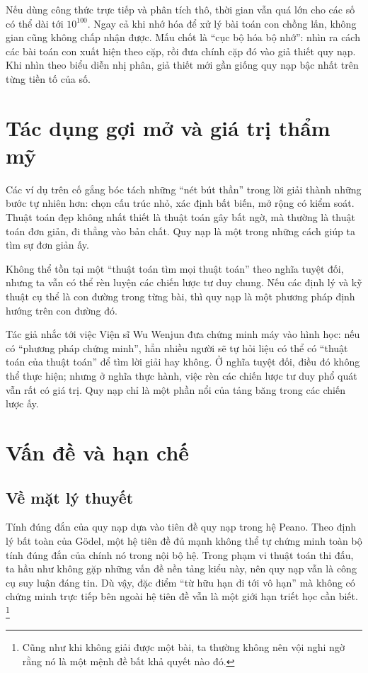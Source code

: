 \documentclass[11pt]{article}
\begin{document}
Nếu dùng công thức trực tiếp và phân tích thô, thời gian vẫn quá lớn cho các
số có thể dài tới \(10^{100}\). Ngay cả khi nhớ hóa để xử lý bài toán con
chồng lấn, không gian cũng không chấp nhận được. Mấu chốt là ``cục bộ hóa bộ
nhớ'': nhìn ra cách các bài toán con xuất hiện theo cặp, rồi đưa chính cặp đó
vào giả thiết quy nạp. Khi nhìn theo biểu diễn nhị phân, giả thiết mới gần
giống quy nạp bậc nhất trên từng tiền tố của số.

\section{Tác dụng gợi mở và giá trị thẩm mỹ}

Các ví dụ trên cố gắng bóc tách những ``nét bút thần'' trong lời giải thành
những bước tự nhiên hơn: chọn cấu trúc nhỏ, xác định bất biến, mở rộng có kiểm
soát. Thuật toán đẹp không nhất thiết là thuật toán gây bất ngờ, mà thường là
thuật toán đơn giản, đi thẳng vào bản chất. Quy nạp là một trong những cách
giúp ta tìm sự đơn giản ấy.

Không thể tồn tại một ``thuật toán tìm mọi thuật toán'' theo nghĩa tuyệt đối,
nhưng ta vẫn có thể rèn luyện các chiến lược tư duy chung. Nếu các định lý và
kỹ thuật cụ thể là con đường trong từng bài, thì quy nạp là một phương pháp
định hướng trên con đường đó.

Tác giả nhắc tới việc Viện sĩ Wu Wenjun đưa chứng minh máy vào hình học: nếu
có ``phương pháp chứng minh'', hẳn nhiều người sẽ tự hỏi liệu có thể có
``thuật toán của thuật toán'' để tìm lời giải hay không. Ở nghĩa tuyệt đối,
điều đó không thể thực hiện; nhưng ở nghĩa thực hành, việc rèn các chiến lược
tư duy phổ quát vẫn rất có giá trị. Quy nạp chỉ là một phần nổi của tảng băng
trong các chiến lược ấy.

\section{Vấn đề và hạn chế}

\subsection{Về mặt lý thuyết}

Tính đúng đắn của quy nạp dựa vào tiên đề quy nạp trong hệ Peano. Theo định
lý bất toàn của Gödel, một hệ tiên đề đủ mạnh không thể tự chứng minh toàn bộ
tính đúng đắn của chính nó trong nội bộ hệ. Trong phạm vi thuật toán thi đấu,
ta hầu như không gặp những vấn đề nền tảng kiểu này, nên quy nạp vẫn là công
cụ suy luận đáng tin. Dù vậy, đặc điểm ``từ hữu hạn đi tới vô hạn'' mà không
có chứng minh trực tiếp bên ngoài hệ tiên đề vẫn là một giới hạn triết học
cần biết.
\footnote{Cũng như khi không giải được một bài, ta thường không nên vội nghi
ngờ rằng nó là một mệnh đề bất khả quyết nào đó.}
\end{document}
